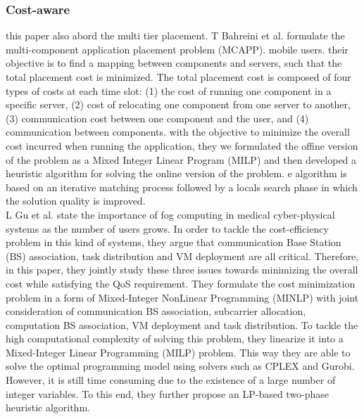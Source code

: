 
\subsubsection{Cost-aware}
\noindent\tab this paper also abord the multi tier placement. T Bahreini et al. \cite{bahreini2017efficient} formulate the multi-component application placement problem (MCAPP). mobile users. their objective is to find a mapping between components and servers, such that the total placement cost is minimized. The total placement cost is composed of four types of costs at each time slot: (1) the cost of running one component in a specific server, (2) cost of relocating one component from one server to another, (3) communication cost between one component and the user, and (4) communication between components. with the objective to minimize the overall cost incurred when running the application, they we formulated the offine version of the problem as a Mixed Integer Linear Program (MILP) and then developed a heuristic algorithm for solving the online version of the problem. e algorithm is based on an iterative matching process followed by a locals search phase in which the solution quality is improved.\\
\noindent\tab L Gu et al. \cite{gu2017cost} state the importance of fog computing in medical cyber-physical systems as the number of users grows. In order to tackle the cost-efficiency problem in this kind of systems, they argue that communication Base Station (BS) association, task distribution and VM deployment are all critical. Therefore, in this paper, they jointly study these three issues towards minimizing the overall cost while satisfying the QoS requirement. They formulate the cost minimization problem in a form of Mixed-Integer NonLinear Programming (MINLP) with joint consideration of communication BS association, subcarrier allocation, computation BS association, VM deployment and task distribution. To tackle the high computational complexity of solving this problem, they linearize it into a Mixed-Integer Linear Programming (MILP) problem. This way they are able to solve the optimal programming model using solvers such as CPLEX and Gurobi. However, it is still time consuming due to the existence of a large number of integer variables. To this end, they further propose an LP-based two-phase heuristic algorithm.\\
